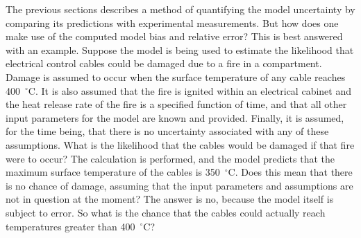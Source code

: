The previous sections describes a method of quantifying the model uncertainty by comparing its predictions with experimental measurements. But how does one make use of the computed
model bias and relative error? This is best answered with an example. Suppose the model is being used to estimate the likelihood that
electrical control cables could be damaged due to
a fire in a compartment. Damage is assumed to occur when the surface temperature of any cable reaches 400~$^\circ$C. It is also assumed that the fire is
ignited within an electrical cabinet and the heat release rate of the fire is a specified function of time, and that all other input
parameters for the model are known and provided. Finally, it is assumed, for the time being, that there is no uncertainty
associated with any of these assumptions. What is the likelihood that the cables would be damaged if that fire were to occur? The calculation is performed, and the
model predicts that the maximum surface temperature of the cables is 350~$^\circ$C. Does this mean that there is no chance of damage, assuming that the input parameters
and assumptions are not in question at the moment? The answer is no, because the model itself is subject to error. So what is the chance that the
cables could actually reach temperatures greater than 400~$^\circ$C?

